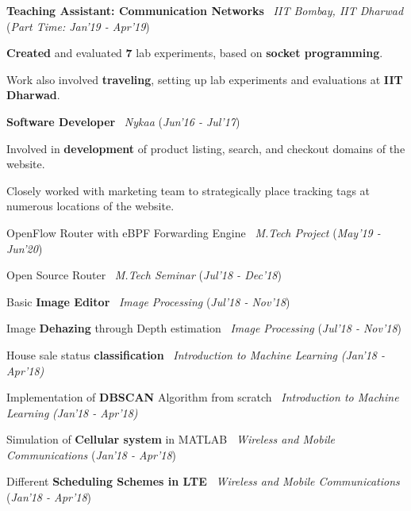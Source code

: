 \documentclass[10pt]{article}
\newcommand{\highlight}[1]{\framecolorbox[\textwidth]{black}{bl}{\makebox[\textwidth][l]{\bfseries \color{black} \uppercase{#1}}}}
\newcommand{\mystyle}[1]{\textit{\textit{\textcolor{llb}{#1}}}}
\begin{document}
\begin{myitemize}
		\item \textbf{Teaching Assistant: Communication Networks} \textpipe\ \mystyle{IIT Bombay, IIT Dharwad} \hfill{(\textit{Part Time: Jan'19 - Apr'19})}
		\begin{myitemize}
			\item \textbf{Created} and evaluated \textbf{7} lab experiments, based on \textbf{socket programming}.
			\item Work also involved \textbf{traveling}, setting up lab experiments and evaluations at \textbf{IIT Dharwad}.
		\end{myitemize}
		
		
		
		\item \textbf{Software Developer} \textpipe\ \mystyle{Nykaa} \hfill{(\textit{Jun'16 - Jul'17})}
		\begin{myitemize}
			\item Involved in \textbf{development} of product listing, search, and checkout domains of the website.
			\item Closely worked with marketing team to strategically place tracking tags at numerous locations of the website.
		\end{myitemize}
	\end{myitemize}

	\highlight{OTHER PROJECTS}
	\begin{myitemize}
		\item OpenFlow Router with eBPF Forwarding Engine \textpipe\ \mystyle{M.Tech Project}
		\hfill{(\textit{May'19 - Jun'20})}
		
		\item Open Source Router \textpipe\ \mystyle{M.Tech Seminar}
		\hfill{(\textit{Jul'18 - Dec'18})}	
	
		\item Basic \textbf{Image Editor} \textpipe\ \mystyle{Image Processing}
		\hfill{(\textit{Jul'18 - Nov'18})}

		\item Image \textbf{Dehazing} through Depth estimation \textpipe\ \mystyle{Image Processing}
		\hfill{(\textit{Jul'18 - Nov'18})}

		\item House sale status \textbf{classification} \textpipe\ \mystyle{Introduction to Machine Learning}
		\hfill{\textit{(Jan'18 - Apr'18)}}

		\item Implementation of \textbf{DBSCAN} Algorithm from scratch \textpipe\ \mystyle{Introduction to Machine Learning}
		\hfill{\textit{(Jan'18 - Apr'18)}}
		
		\item Simulation of \textbf{Cellular system} in MATLAB \textpipe\ \mystyle{Wireless and Mobile Communications}
		\hfill{(\textit{Jan'18 - Apr'18})}

		\item Different \textbf{Scheduling Schemes in LTE} \textpipe\ \mystyle{Wireless and Mobile Communications}
		\hfill{(\textit{Jan'18 - Apr'18})}
	\end{myitemize}
\end{document}
